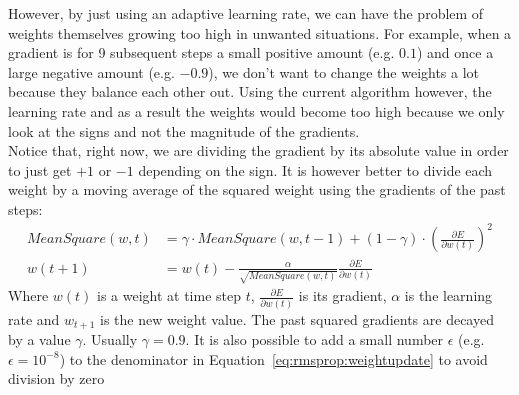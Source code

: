 However, by just using an adaptive learning rate, we can have the problem of weights themselves growing too high in unwanted situations. For example, when a gradient is for 9 subsequent steps a small positive amount (e.g. $0.1$) and once a large negative amount (e.g. $-0.9$), we don't want to change the weights a lot because they balance each other out.
Using the current algorithm however, the learning rate and as a result the weights would become too high because we only look at the signs and not the magnitude of the gradients.\\
Notice that, right now, we are dividing the gradient by its absolute value in order to just get $+1$ or $-1$ depending on the sign. It is however better to divide each weight by a moving average of the squared weight using the gradients of the past steps:
\begin{subequations}
\label{eq:rmsprop}
\begin{align}
MeanSquare(w, t) &= \gamma \cdot MeanSquare(w, t-1) + (1 - \gamma) \cdot \left (\frac{\partial E}{\partial w(t)} \right )^2 \\
w(t+1) &= w(t) - \frac{\alpha}{\sqrt{MeanSquare(w,t)}}\frac{\partial E}{\partial w(t)} \label{eq:rmsprop:weightupdate}
\end{align}
\end{subequations}
Where $w(t)$ is a weight at time step $t$, $\frac{\partial E}{\partial w(t)}$ is its gradient, $\alpha$ is the learning rate and $w_{t+1}$ is the new weight value. The past squared gradients are decayed by a value $\gamma$. Usually $\gamma=0.9$. It is also possible to add a small number $\epsilon$ (e.g. $\epsilon = 10^{-8}$) to the denominator in Equation~\ref{eq:rmsprop:weightupdate} to avoid division by zero

